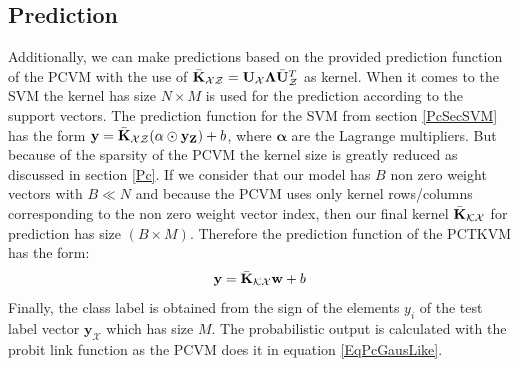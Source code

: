 \subsection{Prediction}\label{InSubSecPrediction}
Additionally, we can make predictions based on the provided prediction function of the \acs{PCVM} with the use of $\bar{\mathbf{K}}_\mathcal{XZ} = \mathbf{U}_\mathcal{X}\mathbf{\Lambda}\bar{\mathbf{U}}_\mathcal{Z}^T$ as kernel.
When it comes to the \acs{SVM} the kernel has size $N\times M$ is used for the prediction according to the support vectors.
The prediction function for the \acs{SVM} from section \ref{PcSecSVM} has the form $\mathbf{y} = \bar{\mathbf{K}}_\mathcal{XZ}(\mathbf{\alpha}\odot\mathbf{y}_\mathbf{Z})+b$, where $\mathbf{\alpha}$ are the Lagrange multipliers.\cite{Long.2015}\newline
But because of the sparsity of the \acs{PCVM} the kernel size is greatly reduced as discussed in section \ref{Pc}.
If we consider that our model has $B$ non zero weight vectors with $B\ll N$ and because the \acs{PCVM} uses only kernel rows/columns corresponding to the non zero weight vector index, then our final kernel $\bar{\mathbf{K}}_\mathcal{KX}$ for prediction has size $(B\times M)$.
Therefore the prediction function of the \acs{PCTKVM} has the form:
\begin{equation}
\mathbf{y} = \bar{\mathbf{K}}_\mathcal{KX}\mathbf{w}+b
\end{equation}
Finally, the class label is obtained from the sign of the elements $y_i$ of the test label vector $\mathbf{y}_\mathcal{X}$ which has size $M$.
The probabilistic output is calculated with the probit link function as the \acs{PCVM} does it in equation \ref{EqPcGausLike}.

